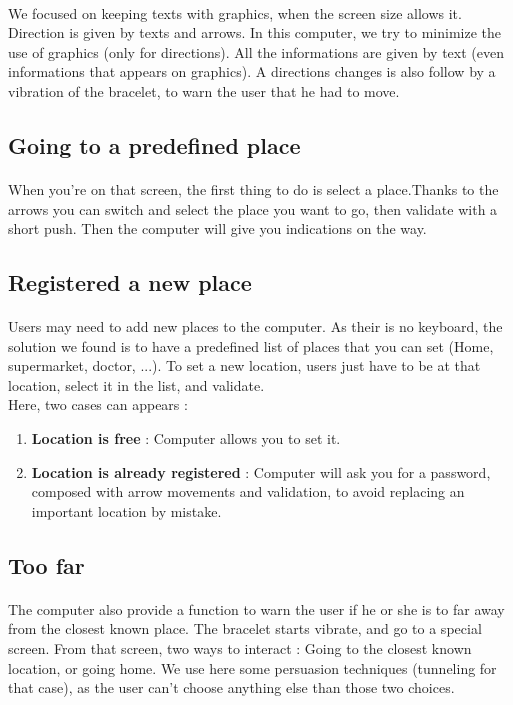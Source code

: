 \documentclass[a4paper,11pt]{article} %
\begin{document}
\paragraph{}We focused on keeping texts with graphics, when the screen size allows it. Direction is given by texts and arrows. In this computer, we try to minimize the use of graphics (only for directions). All the informations are given by text (even informations that appears on graphics). A directions changes is also follow by a vibration of the bracelet, to warn the user that he had to move.
\subsection{Going to a predefined place}
\paragraph{} When you're on that screen, the first thing to do is select a place.Thanks to the arrows you can switch and select the place you want to go, then validate with a short push. Then the computer will give you indications on the way.
\subsection{Registered a new place}
\paragraph{}Users may need to add new places to the computer. As their is no keyboard, the solution we found is to have a predefined list of places that you can set (Home, supermarket, doctor, ...). To set a new location, users just have to be at that location, select it in the list, and validate.\\
Here, two cases can appears : 
\begin{enumerate}
\item \textbf{Location is free} : Computer allows you to set it.
\item \textbf{Location is already registered} : Computer will ask you for a password, composed with arrow movements and validation, to avoid replacing an important location by mistake. 
\end{enumerate}

\subsection{Too far}
\paragraph{}The computer also provide a function to warn the user if he or she is to far away from the closest known place. The bracelet starts vibrate, and go to a special screen. From that screen, two ways to interact : Going to the closest known location, or going home. We use here some persuasion techniques (tunneling for that case), as the user can't choose anything else than those two choices.
\end{document}
